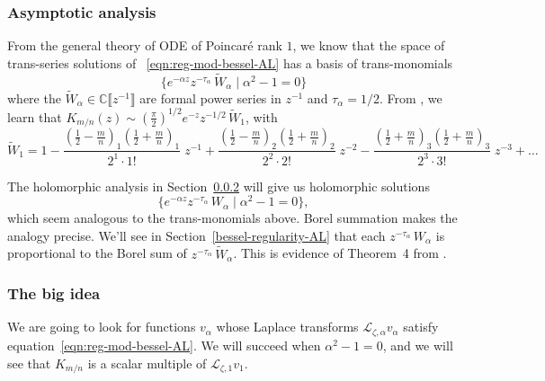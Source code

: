\documentclass{article}
\newcommand{\C}{\mathbb{C}}
\newcommand{\series}[1]{\tilde{#1}}
\newcommand{\laplace}{\mathcal{L}}
\theoremstyle{definition}
\theoremstyle{plain}
\begin{document}
\subsubsection{Asymptotic analysis}\label{sec:asympt-AL}

From the general theory of ODE of Poincar\'e rank $1$, we know that the space of trans-series solutions of ~\eqref{eqn:reg-mod-bessel-AL} has a basis of trans-monomials
\[ \{ e^{-\alpha z} z^{-\tau_\alpha}\,\series{W}_\alpha \mid \alpha^2 - 1 = 0 \} \]
where the $\series{W}_\alpha\in\C\llbracket z^{-1} \rrbracket$ are formal power series in $z^{-1}$ and $\tau_\alpha=1/2$. From \cite[Equations 10.40.2 and 10.17.1]{dlmf}, we learn that $K_{m/n}(z) \sim \left(\tfrac{\pi}{2}\right)^{1/2} e^{-z} z^{-1/2}\,\series{W}_1$, with
\begin{equation}\label{bessel-asymp-AL}
\series{W}_1 = 1 - \frac{(\tfrac{1}{2}-\tfrac{m}{n})_1 (\tfrac{1}{2}+\frac{m}{n})_1}{2^1 \cdot 1!}\;z^{-1} + \frac{(\tfrac{1}{2}-\tfrac{m}{n})_2 (\tfrac{1}{2}+\tfrac{m}{n})_2}{2^2 \cdot 2!}\;z^{-2} - \frac{(\tfrac{1}{2}+\tfrac{m}{n})_3 (\tfrac{1}{2}+\tfrac{m}{n})_3}{2^3 \cdot 3!}\;z^{-3} + \ldots
\end{equation}

The holomorphic analysis in Section~\ref{big-idea} will give us holomorphic solutions
\[ \{ e^{-\alpha z} z^{-\tau_\alpha}\,W_\alpha \mid \alpha^2 - 1 = 0 \}, \]
which seem analogous to the trans-monomials above. Borel summation makes the analogy precise. We’ll see in Section~\ref{bessel-regularity-AL} that each $z^{-\tau_\alpha}\,W_\alpha$ is proportional to the Borel sum of $z^{-\tau_\alpha}\,\series{W}_\alpha$. This is evidence of Theorem~4 from \cite{reg-sing-volterra}.
\subsubsection{The big idea}\label{big-idea}
We are going to look for functions $v_\alpha$ whose Laplace transforms $\laplace_{\zeta, \alpha} v_\alpha$ satisfy equation~\eqref{eqn:reg-mod-bessel-AL}. We will succeed when $\alpha^2 - 1 = 0$, and we will see that $K_{m/n}$ is a scalar multiple of $\laplace_{\zeta, 1} v_1$.
\end{document}
